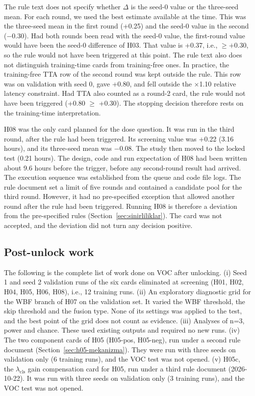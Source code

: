 The rule text does not specify whether $\Delta$ is the seed-0 value or the three-seed mean. For each round, we used the best estimate available at the time. This was the three-seed mean in the first round (+0.25) and the seed-0 value in the second ($-$0.30). Had both rounds been read with the seed-0 value, the first-round value would have been the seed-0 difference of H03. That value is +0.37, i.e., $\ge+0.30$, so the rule would not have been triggered at this point. The rule text also does not distinguish training-time cards from training-free ones. In practice, the training-free TTA row of the second round was kept outside the rule. This row was on validation with seed 0, gave +0.80, and fell outside the $\times$1.10 relative latency constraint. Had TTA also counted as a round-2 card, the rule would not have been triggered (+0.80 $\ge$ +0.30). The stopping decision therefore rests on the training-time interpretation.

H08 was the only card planned for the dose question. It was run in the third round, after the rule had been triggered. Its screening value was +0.22 (3.16 hours), and its three-seed mean was $-$0.08. The study then moved to the locked test (0.21 hours). The design, code and run expectation of H08 had been written about 9.6 hours before the trigger, before any second-round result had arrived. The execution sequence was established from the queue and code file logs. The rule document set a limit of five rounds and contained a candidate pool for the third round. However, it had no pre-specified exception that allowed another round after the rule had been triggered. Running H08 is therefore a deviation from the pre-specified rules (Section~\ref{sec:sinirliliklar}). The card was not accepted, and the deviation did not turn any decision positive.

\subsection{Post-unlock work}\label{sec:ek-kilit}
The following is the complete list of work done on VOC after unlocking.
(i) Seed 1 and seed 2 validation runs of the six cards eliminated at screening (H01, H02, H04, H05, H06, H08), i.e., 12 training runs.
(ii) An exploratory diagnostic grid for the WBF branch of H07 on the validation set. It varied the WBF threshold, the skip threshold and the fusion type. None of its settings was applied to the test, and the best point of the grid does not count as evidence.
(iii) Analyses of n=3, power and chance. These used existing outputs and required no new runs.
(iv) The two component cards of H05 (H05-pos, H05-neg), run under a second rule document (Section~\ref{sec:h05-mekanizma}). They were run with three seeds on validation only (6 training runs), and the VOC test was not opened.
(v) H05c, the $\lambda_{\mathrm{cls}}$ gain compensation card for H05, run under a third rule document (2026-10-22). It was run with three seeds on validation only (3 training runs), and the VOC test was not opened.

